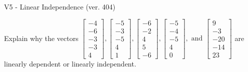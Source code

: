 \begin{exercise}
  \begin{exerciseTitle}V5 - Linear Independence (ver. 404)\end{exerciseTitle}
  \begin{exerciseStatement}
    Explain why the vectors \(\left[\begin{array}{r}
-4 \\
-6 \\
-3 \\
-3 \\
4
\end{array}\right] , \left[\begin{array}{r}
-5 \\
-3 \\
-5 \\
4 \\
1
\end{array}\right] , \left[\begin{array}{r}
-6 \\
-2 \\
4 \\
5 \\
-6
\end{array}\right] , \left[\begin{array}{r}
-5 \\
-4 \\
-5 \\
4 \\
0
\end{array}\right] , \text{ and } \left[\begin{array}{r}
9 \\
-3 \\
-20 \\
-14 \\
23
\end{array}\right]\) are linearly dependent or linearly independent.	



\end{exerciseStatement}
\end{exercise}
